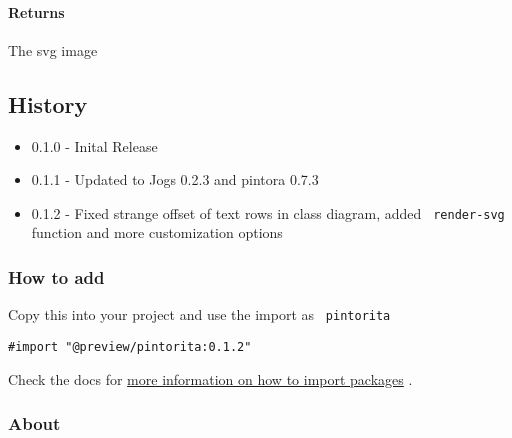 \paragraph{Returns}\label{returns-1}

The svg image

\subsection{History}\label{history}

\begin{itemize}
\tightlist
\item
  0.1.0 - Inital Release
\item
  0.1.1 - Updated to Jogs 0.2.3 and pintora 0.7.3
\item
  0.1.2 - Fixed strange offset of text rows in class diagram, added
  \texttt{\ render-svg\ } function and more customization options
\end{itemize}

\subsubsection{How to add}\label{how-to-add}

Copy this into your project and use the import as \texttt{\ pintorita\ }

\begin{verbatim}
#import "@preview/pintorita:0.1.2"
\end{verbatim}



Check the docs for
\href{https://typst.app/docs/reference/scripting/\#packages}{more
information on how to import packages} .

\subsubsection{About}\label{about}


